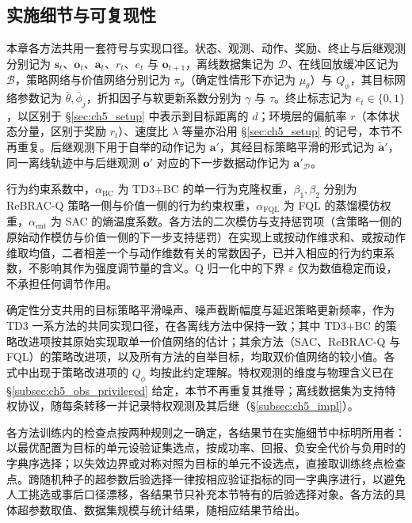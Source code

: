 \subsection{实施细节与可复现性}\label{subsec:ch5_method_impl}

本章各方法共用一套符号与实现口径。状态、观测、动作、奖励、终止与后继观测分别记为 $\mathbf{s}_t$、$\mathbf{o}_t$、$\mathbf{a}_t$、$r_t$、$e_t$ 与 $\mathbf{o}_{t+1}$，离线数据集记为 $\mathcal{D}$、在线回放缓冲区记为 $\mathcal{B}$，策略网络与价值网络分别记为 $\pi_\theta$（确定性情形下亦记为 $\mu_\theta$）与 $Q_\phi$，其目标网络参数记为 $\bar\theta,\bar\phi_j$，折扣因子与软更新系数分别为 $\gamma$ 与 $\tau$。终止标志记为 $e_t\in\{0,1\}$，以区别于 \S\ref{sec:ch5_setup} 中表示到目标距离的 $d$；环境层的偏航率 $r$（本体状态分量，区别于奖励 $r_t$）、速度比 $\lambda$ 等量亦沿用 \S\ref{sec:ch5_setup} 的记号，本节不再重复。后继观测下用于自举的动作记为 $\mathbf{a}'$，其经目标策略平滑的形式记为 $\tilde{\mathbf{a}}'$，同一离线轨迹中与后继观测 $\mathbf{o}'$ 对应的下一步数据动作记为 $\mathbf{a}'_{\mathcal D}$。

行为约束系数中，$\alpha_{\mathrm{BC}}$ 为 TD3+BC 的单一行为克隆权重，$\beta_1,\beta_2$ 分别为 ReBRAC-Q 策略一侧与价值一侧的行为约束权重，$\alpha_{\mathrm{FQL}}$ 为 FQL 的蒸馏模仿权重，$\alpha_{\mathrm{ent}}$ 为 SAC 的熵温度系数。各方法的二次模仿与支持惩罚项（含策略一侧的原始动作模仿与价值一侧的下一步支持惩罚）在实现上或按动作维求和、或按动作维取均值，二者相差一个与动作维数有关的常数因子，已并入相应的行为约束系数，不影响其作为强度调节量的含义。Q 归一化中的下界 $\varepsilon$ 仅为数值稳定而设，不承担任何调节作用。

确定性分支共用的目标策略平滑噪声、噪声截断幅度与延迟策略更新频率，作为 TD3 一系方法的共同实现口径，在各离线方法中保持一致；其中 TD3+BC 的策略改进项按其原始实现取单一价值网络的估计；其余方法（SAC、ReBRAC-Q 与 FQL）的策略改进项，以及所有方法的自举目标，均取双价值网络的较小值。各式中出现于策略改进项的 $Q_\phi$ 均按此约定理解。特权观测的维度与物理含义已在 \S\ref{subsec:ch5_obs_privileged} 给定，本节不再重复其推导；离线数据集为支持特权协议，随每条转移一并记录特权观测及其后继（\S\ref{subsec:ch5_impl}）。

各方法训练内的检查点按两种规则之一确定，各结果节在实施细节中标明所用者：以最优配置为目标的单元设验证集选点，按成功率、回报、负安全代价与负用时的字典序选择；以失效边界或对称对照为目标的单元不设选点，直接取训练终点检查点。跨随机种子的超参数后验选择一律按相应验证指标的同一字典序进行，以避免人工挑选或事后口径漂移，各结果节只补充本节特有的后验选择对象。各方法的具体超参数取值、数据集规模与统计结果，随相应结果节给出。

